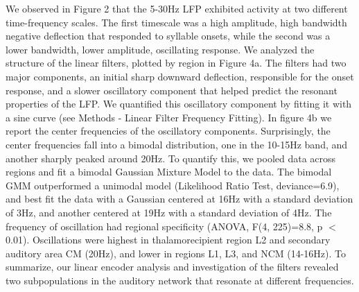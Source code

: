 We observed in Figure 2 that the 5-30Hz LFP exhibited activity at two different time-frequency scales. The first timescale was a high amplitude, high bandwidth negative deflection that responded to syllable onsets, while the second was a lower bandwidth, lower amplitude, oscillating response. We analyzed the structure of the linear filters, plotted by region in Figure 4a. The filters had two major components, an initial sharp downward deflection, responsible for the onset response, and a slower oscillatory component that helped predict the resonant properties of the LFP. We quantified this oscillatory component by fitting it with a sine curve (see Methods - Linear Filter Frequency Fitting). In figure 4b we report the center frequencies of the oscillatory components. Surprisingly, the center frequencies fall into a bimodal distribution, one in the 10-15Hz band, and another sharply peaked around 20Hz. To quantify this, we pooled data across regions and fit a bimodal Gaussian Mixture Model to the data. The bimodal GMM outperformed a unimodal model (Likelihood Ratio Test, deviance=6.9), and best fit the data with a Gaussian centered at 16Hz with a standard deviation of 3Hz, and another centered at 19Hz with a standard deviation of 4Hz. The frequency of oscillation had regional specificity (ANOVA, F(4, 225)=8.8, p $<$ 0.01). Oscillations were highest in thalamorecipient region L2 and secondary auditory area CM (20Hz), and lower in regions L1, L3, and NCM (14-16Hz). To summarize, our linear encoder analysis and investigation of the filters revealed two subpopulations in the auditory network that resonate at different frequencies.

